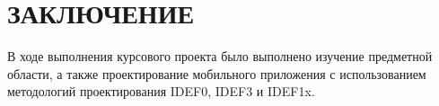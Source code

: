 \section*{ЗАКЛЮЧЕНИЕ}

В ходе выполнения курсового проекта было выполнено
изучение предметной области, а также проектирование мобильного приложения
с использованием методологий проектирования IDEF0, IDEF3 и IDEF1x.